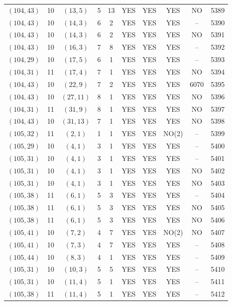 \begin{longtable}{|c|c|c|c|c|c|c|c|c|c|}
$(104, 43)$ & 10 & $(13, 5)$ & 5 & 13 & YES & YES & YES & NO & 5389\\
$(104, 43)$ & 10 & $(14, 3)$ & 6 & 2 & YES & YES & YES & -- & 5390\\
$(104, 43)$ & 10 & $(14, 3)$ & 6 & 2 & YES & YES & YES & NO & 5391\\
$(104, 43)$ & 10 & $(16, 3)$ & 7 & 8 & YES & YES & YES & -- & 5392\\
$(104, 29)$ & 10 & $(17, 5)$ & 6 & 1 & YES & YES & YES & -- & 5393\\
$(104, 31)$ & 11 & $(17, 4)$ & 7 & 1 & YES & YES & YES & NO & 5394\\
$(104, 43)$ & 10 & $(22, 9)$ & 7 & 2 & YES & YES & YES & 6070 & 5395\\
$(104, 43)$ & 10 & $(27, 11)$ & 8 & 1 & YES & YES & YES & NO & 5396\\
$(104, 31)$ & 11 & $(31, 9)$ & 8 & 1 & YES & YES & YES & NO & 5397\\
$(104, 43)$ & 10 & $(31, 13)$ & 7 & 1 & YES & YES & YES & NO & 5398\\
$(105, 32)$ & 11 & $(2, 1)$ & 1 & 1 & YES & YES & NO(2) & -- & 5399\\
$(105, 29)$ & 10 & $(4, 1)$ & 3 & 1 & YES & YES & YES & -- & 5400\\
$(105, 31)$ & 10 & $(4, 1)$ & 3 & 1 & YES & YES & YES & -- & 5401\\
$(105, 31)$ & 10 & $(4, 1)$ & 3 & 1 & YES & YES & YES & NO & 5402\\
$(105, 31)$ & 10 & $(4, 1)$ & 3 & 1 & YES & YES & YES & NO & 5403\\
$(105, 38)$ & 11 & $(6, 1)$ & 5 & 3 & YES & YES & YES & -- & 5404\\
$(105, 38)$ & 11 & $(6, 1)$ & 5 & 3 & YES & YES & YES & NO & 5405\\
$(105, 38)$ & 11 & $(6, 1)$ & 5 & 3 & YES & YES & YES & NO & 5406\\
$(105, 41)$ & 10 & $(7, 2)$ & 4 & 7 & YES & YES & NO(2) & NO & 5407\\
$(105, 41)$ & 10 & $(7, 3)$ & 4 & 7 & YES & YES & YES & -- & 5408\\
$(105, 44)$ & 10 & $(8, 3)$ & 4 & 1 & YES & YES & YES & -- & 5409\\
$(105, 31)$ & 10 & $(10, 3)$ & 5 & 5 & YES & YES & YES & -- & 5410\\
$(105, 31)$ & 10 & $(11, 4)$ & 5 & 1 & YES & YES & YES & -- & 5411\\
$(105, 38)$ & 11 & $(11, 4)$ & 5 & 1 & YES & YES & YES & -- & 5412\\

\end{longtable}
